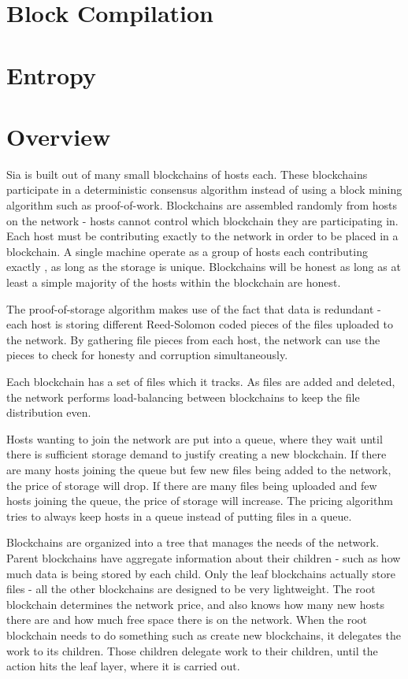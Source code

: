 \documentclass[twocolumn]{article}
\begin{document}
\section{Block Compilation}

\section{Entropy}

\section{Overview}

Sia is built out of many small blockchains of \numhosts{} hosts each.
These blockchains participate in a deterministic consensus algorithm instead of using a block mining algorithm such as proof-of-work.
Blockchains are assembled randomly from hosts on the network - hosts cannot control which blockchain they are participating in.
Each host must be contributing exactly \storageperhost{} to the network in order to be placed in a blockchain.
A single machine operate as a group of hosts each contributing exactly \storageperhost{}, as long as the storage is unique.
Blockchains will be honest as long as at least a simple majority of the hosts within the blockchain are honest.

The proof-of-storage algorithm makes use of the fact that data is redundant - each host is storing different Reed-Solomon coded pieces of the files uploaded to the network.
By gathering file pieces from each host, the network can use the pieces to check for honesty and corruption simultaneously.

Each blockchain has a set of files which it tracks.
As files are added and deleted, the network performs load-balancing between blockchains to keep the file distribution even.

Hosts wanting to join the network are put into a queue, where they wait until there is sufficient storage demand to justify creating a new blockchain.
If there are many hosts joining the queue but few new files being added to the network, the price of storage will drop.
If there are many files being uploaded and few hosts joining the queue, the price of storage will increase.
The pricing algorithm tries to always keep hosts in a queue instead of putting files in a queue.

Blockchains are organized into a tree that manages the needs of the network.
Parent blockchains have aggregate information about their children - such as how much data is being stored by each child.
Only the leaf blockchains actually store files - all the other blockchains are designed to be very lightweight.
The root blockchain determines the network price, and also knows how many new hosts there are and how much free space there is on the network.
When the root blockchain needs to do something such as create new blockchains, it delegates the work to its children.
Those children delegate work to their children, until the action hits the leaf layer, where it is carried out.
\end{document}
